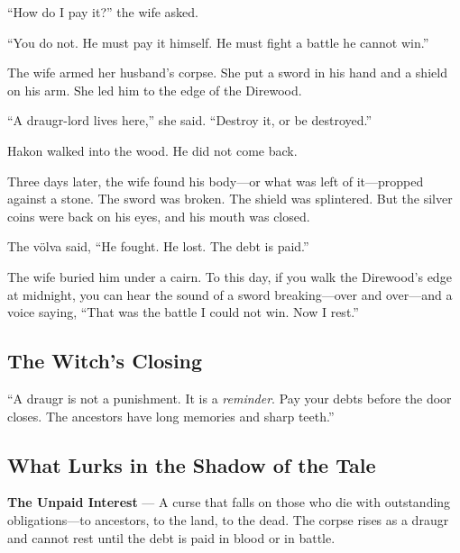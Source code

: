 \documentclass[9pt,a5paper]{extbook}
\begin{document}
``How do I pay it?'' the wife asked.

``You do not. He must pay it himself. He must fight a battle he cannot win.''

The wife armed her husband's corpse. She put a sword in his hand and a shield on his arm. She led him to the edge of the Direwood.

``A draugr-lord lives here,'' she said. ``Destroy it, or be destroyed.''

Hakon walked into the wood. He did not come back.

Three days later, the wife found his body---or what was left of it---propped against a stone. The sword was broken. The shield was splintered. But the silver coins were back on his eyes, and his mouth was closed.

The völva said, ``He fought. He lost. The debt is paid.''

The wife buried him under a cairn. To this day, if you walk the Direwood's edge at midnight, you can hear the sound of a sword breaking---over and over---and a voice saying, ``That was the battle I could not win. Now I rest.''

\subsection*{The Witch's Closing}

``A draugr is not a punishment. It is a \textit{reminder}. Pay your debts before the door closes. The ancestors have long memories and sharp teeth.''

\subsection*{What Lurks in the Shadow of the Tale}

\textbf{The Unpaid Interest} --- A curse that falls on those who die with outstanding obligations---to ancestors, to the land, to the dead. The corpse rises as a draugr and cannot rest until the debt is paid in blood or in battle.
\end{document}
